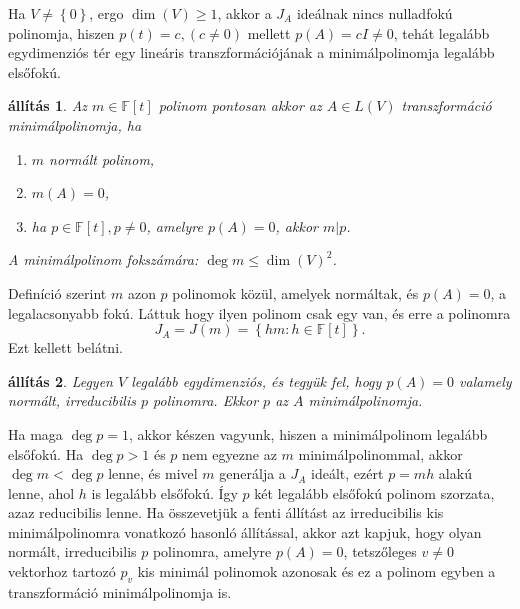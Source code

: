 \documentclass[9pt, a4paper, showtrims]{memoir}
\makeatletter
\renewenvironment{proof}[1][\proofname]
    {\par\pushQED{\qed}%
    \normalfont \topsep6\p@\@plus6\p@\relax
    \trivlist
    \item[\hskip\labelsep
        \itshape
    #1\@addpunct{:}]\ignorespaces}
    {\popQED\endtrivlist\@endpefalse}
\theoremstyle{plain}
\newtheorem{proposition}{állítás}[chapter]
\theoremstyle{remark}
\theoremstyle{definition}
\makeatother
\begin{document}
Ha $V\neq\left\{ 0 \right\}$, ergo $\dim(V)\geq 1$,
akkor a $J_{A}$ ideálnak nincs nulladfokú polinomja,
hiszen $p(t)=c, (c\neq 0)$ mellett
$p\left( A \right)=cI\neq 0$,
tehát legalább egydimenziós tér egy lineáris transzformációjának a minimálpolinomja legalább elsőfokú.
\begin{proposition}
	Az  $m\in\mathbb{F}\left[ t \right]$ polinom pontosan akkor
	az $A\in L\left( V \right)$ transzformáció minimálpolinomja,
	ha
	\begin{enumerate}
		\item $m$ normált polinom,
		\item $m\left( A \right)=0$,
		\item ha $p\in\mathbb{F}\left[ t \right], p\neq 0$, amelyre
		      $p\left( A \right)=0$, akkor $m|p$.
	\end{enumerate}
	A minimálpolinom fokszámára:
	$\deg m\leq\dim(V)^2$.
\end{proposition}
\begin{proof}
	Definíció szerint $m$ azon $p$ polinomok közül,
	amelyek normáltak, és $p\left( A \right)=0$, a legalacsonyabb fokú.
	Láttuk hogy ilyen polinom csak egy van, és erre a polinomra
	\[
		J_{A}=J\left( m \right)=\left\{ hm:h\in\mathbb{F}\left[ t \right] \right\}.
	\]
	Ezt kellett belátni.
\end{proof}
\begin{proposition}
	Legyen $V$ legalább egydimenziós,
	és tegyük fel, hogy $p\left( A \right)=0$ valamely normált,
	irreducibilis $p$ polinomra.
	Ekkor $p$ az $A$ minimálpolinomja.
\end{proposition}
\begin{proof}
	Ha maga $\deg p=1$, akkor készen vagyunk, hiszen a minimálpolinom legalább elsőfokú.
	Ha $\deg p>1$ és $p$ nem egyezne az $m$ minimálpolinommal,
	akkor $\deg m<\deg p$ lenne, és mivel $m$ generálja a $J_{A}$ ideált,
	ezért $p=mh$ alakú lenne, ahol $h$ is legalább elsőfokú.
	Így $p$ két legalább elsőfokú polinom szorzata, azaz reducibilis lenne.
\end{proof}
Ha összevetjük a fenti állítást az irreducibilis kis minimálpolinomra vonatkozó hasonló állítással,
akkor azt kapjuk, hogy olyan normált, irreducibilis $p$ polinomra, 
amelyre $p\left( A \right)=0$, tetszőleges $v\neq 0$ vektorhoz tartozó $p_v$ kis minimál polinomok azonosak
és ez a polinom egyben a transzformáció minimálpolinomja is.
\end{document}
